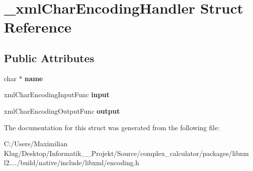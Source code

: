 \hypertarget{struct__xml_char_encoding_handler}{}\section{\+\_\+xml\+Char\+Encoding\+Handler Struct Reference}
\label{struct__xml_char_encoding_handler}
\subsection*{Public Attributes}
\begin{DoxyCompactItemize}
\item 
\mbox{\label{struct__xml_char_encoding_handler_a9cafc98368bd39e4c7db5cd68da1235e}} 
char $\ast$ {\bfseries name}
\item 
\mbox{\label{struct__xml_char_encoding_handler_a83ab9925e70e9cf4570e0606e04ce83d}} 
xml\+Char\+Encoding\+Input\+Func {\bfseries input}
\item 
\mbox{\label{struct__xml_char_encoding_handler_a0431378526b6f123baa7d15454b7c992}} 
xml\+Char\+Encoding\+Output\+Func {\bfseries output}
\end{DoxyCompactItemize}


The documentation for this struct was generated from the following file\+:\begin{DoxyCompactItemize}
\item 
C\+:/\+Users/\+Maximilian Klug/\+Desktop/\+Informatik\+\_\+\_\+\+Projekt/\+Source/complex\+\_\+calculator/packages/libxml2..../build/native/include/libxml/encoding.\+h\end{DoxyCompactItemize}
